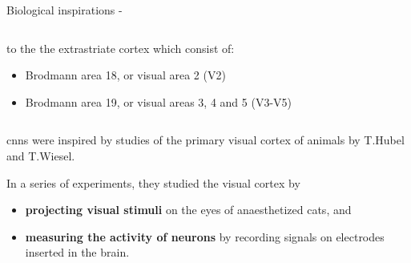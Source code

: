 \begin{frame}[t,allowframebreaks]{Biological inspirations - }
\begin{columns}
\begin{column}{0.62\textwidth}
\begin{itemize}
                 to the the extrastriate cortex which consist of:
                 \begin{itemize}
                    \item Brodmann area 18, or visual area 2 (V2)
                    \item Brodmann area 19, or visual areas 3, 4 and 5 (V3-V5)
                \end{itemize}                    
            \end{itemize}                
        \end{column}
    \end{columns}


    \framebreak

    \glspl{cnn} 
    were inspired by studies of the 
    \gls{primary visual cortex}
    of animals
    by T.Hubel and T.Wiesel\cite{Hubel:1959v1,Hubel:1962v1}.

    In a series of experiments, they studied the visual cortex by 
    \begin{itemize}
    \item {\bf projecting visual stimuli} on the 
      eyes of anaesthetized cats, and
    \item {\bf measuring the activity of neurons} by recording signals 
      on electrodes inserted in the brain.
    \end{itemize}


\end{frame}
